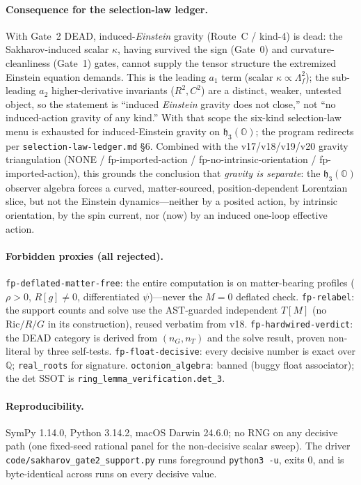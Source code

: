 \documentclass[11pt]{article}
\newcommand{\h}{\mathfrak{h}}
\newcommand{\Oo}{\mathbb{O}}
\newcommand{\QQ}{\mathbb{Q}}
\begin{document}
\paragraph{Consequence for the selection-law ledger.} With Gate~2 DEAD, induced-\emph{Einstein}
gravity (Route~C / kind-4) is dead: the Sakharov-induced scalar $\kappa$, having survived the sign
(Gate~0) and curvature-cleanliness (Gate~1) gates, cannot supply the tensor structure the
extremized Einstein equation demands. This is the leading $a_1$ term (scalar $\kappa\propto\Lambda_f^2$);
the sub-leading $a_2$ higher-derivative invariants ($R^2,C^2$) are a distinct, weaker, untested
object, so the statement is ``induced \emph{Einstein} gravity does not close,'' not ``no induced-action
gravity of any kind.'' With that scope the six-kind selection-law menu is exhausted for
induced-Einstein gravity on $\h_3(\Oo)$; the program redirects per \texttt{selection-law-ledger.md} \S6. Combined with the
v17/v18/v19/v20 gravity triangulation (NONE / fp-imported-action / fp-no-intrinsic-orientation /
fp-imported-action), this grounds the conclusion that \emph{gravity is separate}: the $\h_3(\Oo)$
observer algebra forces a curved, matter-sourced, position-dependent Lorentzian slice, but not
the Einstein dynamics---neither by a posited action, by intrinsic orientation, by the spin
current, nor (now) by an induced one-loop effective action.

\paragraph{Forbidden proxies (all rejected).}
\texttt{fp-deflated-matter-free}: the entire computation is on matter-bearing profiles
($\rho>0$, $R[g]\neq0$, differentiated $\psi$)---never the $M=0$ deflated check.
\texttt{fp-relabel}: the support counts and solve use the AST-guarded independent $T[M]$ (no
$\mathrm{Ric}/R/G$ in its construction), reused verbatim from v18. \texttt{fp-hardwired-verdict}:
the DEAD category is derived from $(n_G,n_T)$ and the solve result, proven non-literal by three
self-tests. \texttt{fp-float-decisive}: every decisive number is exact over $\QQ$;
\texttt{real\_roots} for signature. \texttt{octonion\_algebra}: banned (buggy float associator);
the det SSOT is \texttt{ring\_lemma\_verification.det\_3}.

\paragraph{Reproducibility.} SymPy 1.14.0, Python 3.14.2, macOS Darwin 24.6.0; no RNG on any
decisive path (one fixed-seed rational panel for the non-decisive scalar sweep). The driver
\texttt{code/sakharov\_gate2\_support.py} runs foreground \texttt{python3 -u}, exits $0$, and is
byte-identical across runs on every decisive value.
\end{document}
